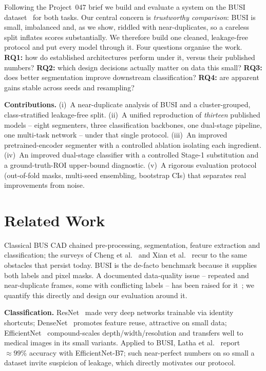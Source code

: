\documentclass[10pt,twocolumn]{article}
\begin{document}
Following the Project~047 brief we build and evaluate a system on the BUSI
dataset~\cite{aldhabyani2020busi} for both tasks. Our central concern is
\emph{trustworthy comparison}: BUSI is small, imbalanced and, as we show, riddled
with near-duplicates, so a careless split inflates scores substantially. We
therefore build one cleaned, leakage-free protocol and put every model through it.
Four questions organise the work. \textbf{RQ1:} how do established architectures
perform under it, versus their published numbers? \textbf{RQ2:} which design
decisions actually matter on data this small? \textbf{RQ3:} does better
segmentation improve downstream classification? \textbf{RQ4:} are apparent gains
stable across seeds and resampling?

\textbf{Contributions.} (i)~A near-duplicate analysis of BUSI and a
cluster-grouped, class-stratified leakage-free split. (ii)~A unified reproduction
of \emph{thirteen} published models -- eight segmenters, three classification
backbones, one dual-stage pipeline, one multi-task network -- under that single
protocol. (iii)~An improved pretrained-encoder segmenter with a controlled
ablation isolating each ingredient. (iv)~An improved dual-stage classifier with a
controlled Stage-1 substitution and a ground-truth-ROI upper-bound diagnostic.
(v)~A rigorous evaluation protocol (out-of-fold masks, multi-seed ensembling,
bootstrap CIs) that separates real improvements from noise.

\section{Related Work}
Classical BUS CAD chained pre-processing, segmentation, feature extraction and
classification; the surveys of Cheng et al.~\cite{cheng2010survey} and Xian et
al.~\cite{xian2018survey} recur to the same obstacles that persist today. BUSI
\cite{aldhabyani2020busi} is the de-facto benchmark because it supplies both labels
and pixel masks. A documented data-quality issue -- repeated and near-duplicate
frames, some with conflicting labels -- has been raised for it~\cite{pawlowska2023};
we quantify this directly and design our evaluation around it.

\textbf{Classification.} ResNet~\cite{he2016resnet} made very deep networks
trainable via identity shortcuts; DenseNet~\cite{huang2017densenet} promotes
feature reuse, attractive on small data; EfficientNet~\cite{tan2019efficientnet}
compound-scales depth/width/resolution and transfers well to medical images in its
small variants. Applied to BUSI, Latha et al.~\cite{latha2024effnetb7} report
$\approx99\%$ accuracy with EfficientNet-B7; such near-perfect numbers on so small
a dataset invite suspicion of leakage, which directly motivates our protocol.
\end{document}
